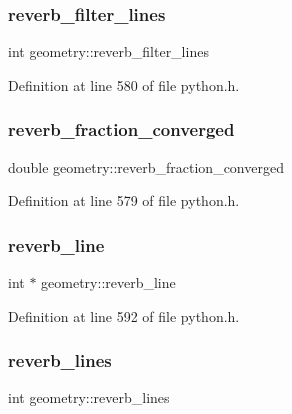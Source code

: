 \subsubsection{\texorpdfstring{reverb\+\_\+filter\+\_\+lines}{reverb\_filter\_lines}}
{\footnotesize\ttfamily int geometry\+::reverb\+\_\+filter\+\_\+lines}



Definition at line 580 of file python.\+h.

\mbox{\label{structgeometry_a38b14c19caa8036cfef9998e80835a57}} 
\subsubsection{\texorpdfstring{reverb\+\_\+fraction\+\_\+converged}{reverb\_fraction\_converged}}
{\footnotesize\ttfamily double geometry\+::reverb\+\_\+fraction\+\_\+converged}



Definition at line 579 of file python.\+h.

\mbox{\label{structgeometry_a4cdefc5ea0664d2351f9242d6dc58418}} 
\subsubsection{\texorpdfstring{reverb\+\_\+line}{reverb\_line}}
{\footnotesize\ttfamily int $\ast$ geometry\+::reverb\+\_\+line}



Definition at line 592 of file python.\+h.

\mbox{\label{structgeometry_aa9806a8b1577355dc4c5b1e6e6ec00d4}} 
\subsubsection{\texorpdfstring{reverb\+\_\+lines}{reverb\_lines}}
{\footnotesize\ttfamily int geometry\+::reverb\+\_\+lines}



